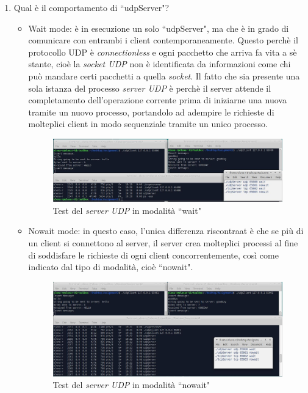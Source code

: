 \documentclass[a4paper, 12pt]{report}
\begin{document}
\begin{enumerate}
	\item Qual è il comportamento di ``udpServer"?
	\begin{itemize}
		\item Wait mode: è in esecuzione un solo ``udpServer", ma che è in grado di comunicare con entrambi i client contemporaneamente. Questo perchè il protocollo UDP è
		\textit{connectionless} e ogni pacchetto che arriva fa vita a sè stante, cioè la \textit{socket UDP} non è identificata da informazioni come chi può mandare certi
		pacchetti a quella  \textit{socket}. Il fatto che sia presente una sola istanza del processo \textit{server UDP} è perchè il server attende il completamento
		dell'operazione corrente prima di iniziarne una nuova tramite un nuovo processo, portandolo ad adempire le richieste di molteplici client in modo sequenziale tramite
		un unico processo.
		\begin{figure}[H]
			\centering
			\includegraphics[width=\linewidth]{images/launch_udpClientWait.JPG}
			\caption{Test del \textit{server UDP} in modalità ``wait"}
		\end{figure}
		\item Nowait mode: in questo caso, l'unica differenza riscontraat è che se più di un client si connettono al server, il server crea molteplici processi al fine di
		soddisfare le richieste di ogni client concorrentemente, così come indicato dal tipo di modalità, cioè ``nowait".
		\begin{figure}[H]
			\centering
			\includegraphics[width=\linewidth]{images/launch_udpClientNowait.JPG}
			\caption{Test del \textit{server UDP} in modalità ``nowait"}

\end{figure}
\end{itemize}
\end{enumerate}
\end{document}
